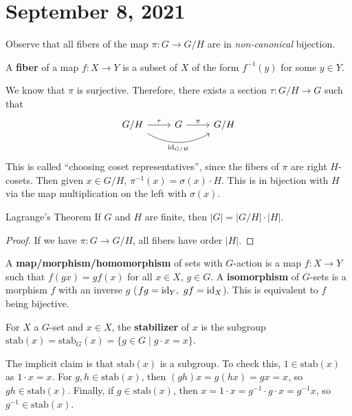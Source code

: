 \section{September 8, 2021} 
Observe that all fibers of the map $\pi \colon G \to G /H$ are in \emph{non-canonical} bijection.

\begin{definition}[]
    A \textbf{fiber} of a map $f \colon X \to Y$ is a subset of $X$ of the form $f^{-1} (y)$ for some $y \in Y$.
\end{definition}
We know that $\pi$ is surjective. Therefore, there exists a section $\tau \colon G / H \to G$ such that \[
\begin{tikzcd}
G/H \arrow[r, "\tau"] \arrow[rr, "\id_{G/H}"', bend right] & G \arrow[r, "\pi"] & G/H
\end{tikzcd}
\] This is called ``choosing coset representatives'', since the fibers of $\pi$ are right $H$-cosets. Then given $x \in G /H$, $\pi ^{-1}(x) = \sigma(x) \cdot H$. This is in bijection with $H$ via the map multiplication on the left with $\sigma(x)$.

\begin{namedthm}{Lagrange's Theorem} 
    If $G$ and $H$ are finite, then $|G|=|G /H| \cdot |H|$. 
\end{namedthm}
\begin{proof}
    If we have $\pi \colon G \to G /H$, all fibers have order $|H|$.
\end{proof}

\begin{definition}[]
    A \textbf{map/morphism/homomorphism} of sets with $G$-action is a map $f \colon X \to Y$ such that $f(gx)=gf(x)$ for all $x \in X$, $g \in G$. A \textbf{isomorphism} of $G$-sets is a morphism $f$ with an inverse $g$ ($fg=\operatorname{id}_Y,\ gf=\operatorname{id}_X$). This is equivalent to $f$ being bijective.
\end{definition}

\begin{definition}[]
    For $X$ a $G$-set and $x \in X$, the \textbf{stabilizer} of $x$ is the subgroup $\mathrm{stab}(x)=\mathrm{stab}_G(x)= \{g \in G\mid g \cdot x=x\} $.
\end{definition} The implicit claim is that $\mathrm{stab}(x)$ is a subgroup. To check this, $1 \in \mathrm{stab}(x)$ as $1 \cdot x=x$. For $g,h \in \mathrm{stab}(x)$, then $(gh)x=g(hx)=gx=x$, so $gh \in \mathrm{stab}(x)$. Finally, if $g \in \mathrm{stab}(x)$, then $x=1\cdot x=g^{-1}\cdot g\cdot x=g^{-1}x$, so $g^{-1} \in \mathrm{stab}(x)$.

